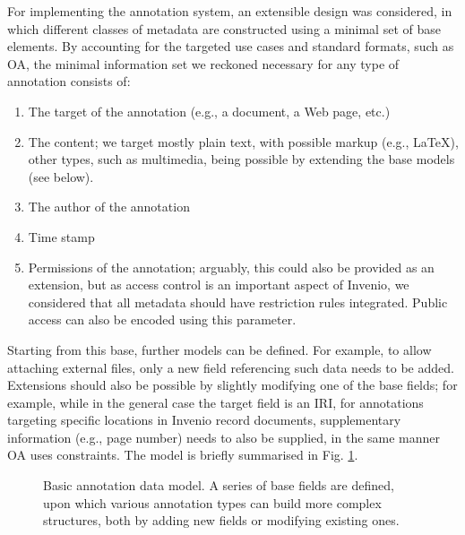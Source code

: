 
For implementing the annotation system, an extensible design was considered, in
which different classes of metadata are constructed using a minimal set of base
elements.  By accounting for the targeted use cases and standard formats, such
as OA, the minimal information set we reckoned necessary for any type of
annotation consists of:
\begin{enumerate}
  \item The target of the annotation (e.g., a document, a Web page, etc.)
  \item The content; we target mostly plain text, with possible markup
        (e.g., \LaTeX), other types, such as multimedia, being possible by
        extending the base models (see below).
  \item The author of the annotation
  \item Time stamp
  \item Permissions of the annotation; arguably, this could also be provided as
        an extension, but as access control is an important aspect of Invenio,
        we considered that all metadata should have restriction rules
        integrated. Public access can also be encoded using this parameter.
\end{enumerate}

Starting from this base, further models can be defined. For example, to allow
attaching external files, only a new field referencing such data needs to be
added. Extensions should also be possible by slightly modifying one of the base
fields; for example, while in the general case the target field is an IRI, for
annotations targeting specific locations in Invenio record documents,
supplementary information (e.g., page number) needs to also be supplied, in the
same manner OA uses constraints. The model is briefly summarised in Fig.
\ref{fig:datamodel}.

\begin{figure}[!ht]
  \centering
  \caption[Basic annotation data model]
          {Basic annotation data model. A series of base fields are defined,
           upon which various annotation types can build more complex
           structures, both by adding new fields or modifying existing ones.}
  \label{fig:datamodel}
\end{figure}

